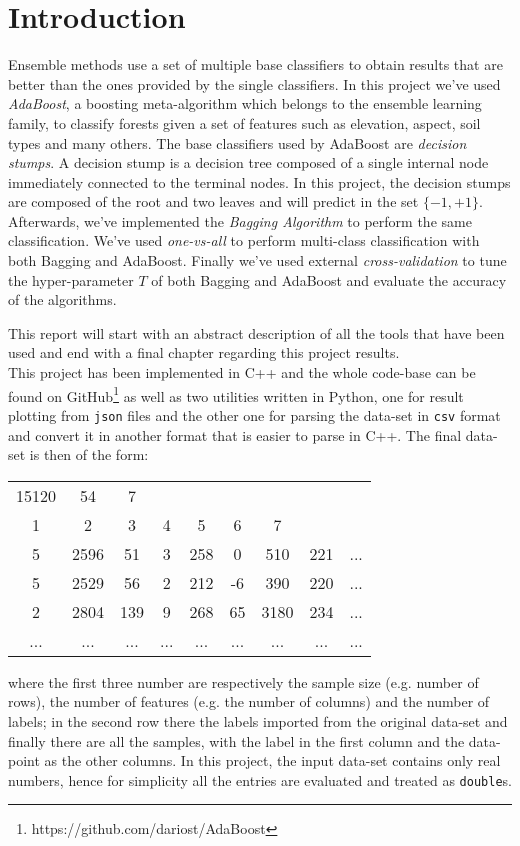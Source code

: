 \chapter{Introduction}
Ensemble methods use a set of multiple base classifiers to obtain results that are better than the ones provided by the single classifiers. In this project we've used \textit{AdaBoost}, a boosting meta-algorithm which belongs to the ensemble learning family, to classify forests given a set of features such as elevation, aspect, soil types and many others. The base classifiers used by AdaBoost are \textit{decision stumps}. A decision stump is a decision tree composed of a single internal node immediately connected to the terminal nodes. In this project, the decision stumps are composed of the root and two leaves and will predict in the set $\lbrace-1, +1\rbrace$. Afterwards, we've implemented the \textit{Bagging Algorithm} to perform the same classification. We've used \textit{one-vs-all} to perform multi-class classification with both Bagging and AdaBoost. Finally we've used external \textit{cross-validation} to tune the hyper-parameter $T$ of both Bagging and AdaBoost and evaluate the accuracy of the algorithms.

This report will start with an abstract description of all the tools that have been used and end with a final chapter regarding this project results.\\
This project has been implemented in C++ and the whole code-base can be found on GitHub\footnote{https://github.com/dariost/AdaBoost} as well as two utilities written in Python, one for result plotting from \texttt{json} files and the other one for parsing the data-set in \texttt{csv} format and convert it in another format that is easier to parse in C++. The final data-set is then of the form:
\begin{center}
\begin{tabular}{ccccccccc}
	15120 & 54 & 7 &  &  &  &  &  &  \\ 
	1 & 2 & 3 & 4 & 5 & 6 & 7 &  &  \\ 
	5 & 2596 & 51 & 3 & 258 & 0 & 510 & 221 & ... \\
	5 & 2529 & 56 & 2 & 212 & -6 & 390 & 220 & ... \\
	2 & 2804 & 139 & 9 & 268 & 65 & 3180 & 234 & ... \\
	... & ... & ... & ... & ... & ... & ... & ... & ... \\
\end{tabular}
\end{center} 
where the first three number are respectively the sample size (e.g. number of rows), the number of features (e.g. the number of columns) and the number of labels; in the second row there the labels imported from the original data-set and finally there are all the samples, with the label in the first column and the data-point as the other columns. In this project, the input data-set contains only real numbers, hence for simplicity all the entries are evaluated and treated as \texttt{double}s.

